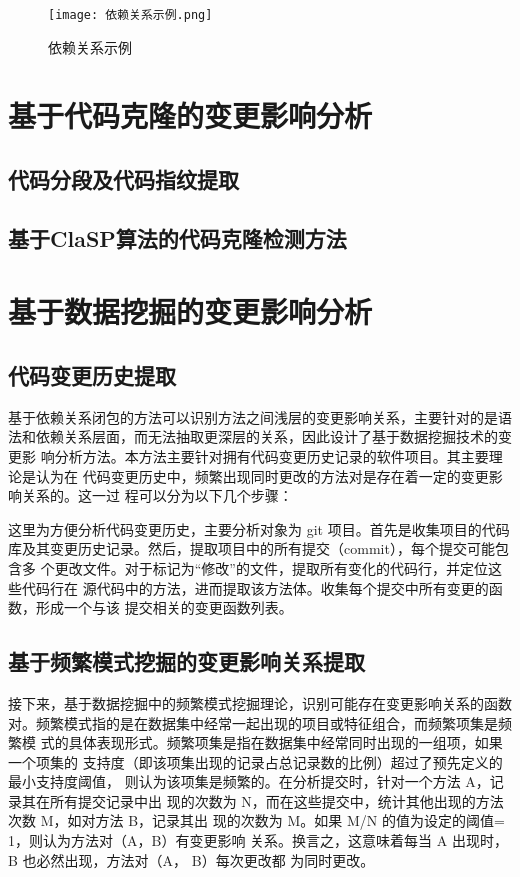 \begin{figure}[h]
\centering
\texttt{[image: 依赖关系示例.png]}
\caption{依赖关系示例}
\end{figure}

\section{基于代码克隆的变更影响分析}
\subsection{代码分段及代码指纹提取}
\subsection{基于ClaSP算法的代码克隆检测方法}

\section{基于数据挖掘的变更影响分析}
\subsection{代码变更历史提取}
基于依赖关系闭包的方法可以识别方法之间浅层的变更影响关系，主要针对的是语
法和依赖关系层面，而无法抽取更深层的关系，因此设计了基于数据挖掘技术的变更影
响分析方法。本方法主要针对拥有代码变更历史记录的软件项目。其主要理论是认为在
代码变更历史中，频繁出现同时更改的方法对是存在着一定的变更影响关系的。这一过
程可以分为以下几个步骤：

这里为方便分析代码变更历史，主要分析对象为 git 项目。首先是收集项目的代码
库及其变更历史记录。然后，提取项目中的所有提交（commit），每个提交可能包含多
个更改文件。对于标记为“修改”的文件，提取所有变化的代码行，并定位这些代码行在
源代码中的方法，进而提取该方法体。收集每个提交中所有变更的函数，形成一个与该
提交相关的变更函数列表。

\subsection{基于频繁模式挖掘的变更影响关系提取}

接下来，基于数据挖掘中的频繁模式挖掘理论，识别可能存在变更影响关系的函数
对。频繁模式指的是在数据集中经常一起出现的项目或特征组合，而频繁项集是频繁模
式的具体表现形式。频繁项集是指在数据集中经常同时出现的一组项，如果一个项集的
支持度（即该项集出现的记录占总记录数的比例）超过了预先定义的最小支持度阈值，
则认为该项集是频繁的。在分析提交时，针对一个方法 A，记录其在所有提交记录中出
现的次数为 N，而在这些提交中，统计其他出现的方法次数 M，如对方法 B，记录其出
现的次数为 M。如果 M/N 的值为设定的阈值= 1，则认为方法对（A，B）有变更影响
关系。换言之，这意味着每当 A 出现时，B 也必然出现，方法对（A， B）每次更改都
为同时更改。

